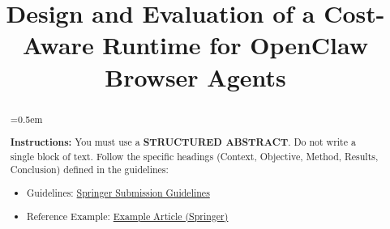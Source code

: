 \documentclass[conference]{IEEEtran}
\newcommand{\instruction}[1]{%
    \begin{list}{}{%
        \leftmargin=10pt
        \rightmargin=10pt
        \topsep=0.5em
    }
    \item[]
    \begingroup
        \color{gray}\itshape
        \small
        
        \textbf{Instructions:} #1
    \endgroup
    \end{list}
}
\begin{document}
\title{Design and Evaluation of a Cost-Aware Runtime for OpenClaw Browser Agents\\
}

\author{
\and
{}
\and
{}
\and
{}
}

\maketitle


\begin{abstract}
\instruction{You must use a \textbf{STRUCTURED ABSTRACT}. Do not write a single block of text.
Follow the specific headings (Context, Objective, Method, Results, Conclusion) defined in the guidelines:
\begin{itemize}
    \item Guidelines: \href{https://link.springer.com/journal/10664/submission-guidelines}{Springer Submission Guidelines}
    \item Reference Example: \href{https://link.springer.com/article/10.1007/s10664-024-10521-0}{Example Article (Springer)}
\end{itemize}}
\end{abstract}
\end{document}
